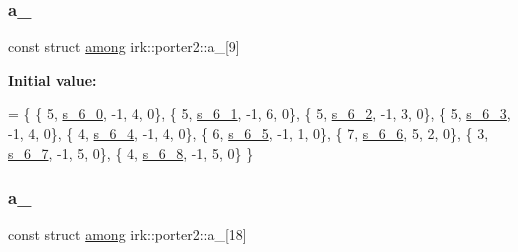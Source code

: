 \mbox{\label{namespaceirk_1_1porter2_a65268a235d37ebbee2bb1feccb9b3073}} 
\subsubsection{\texorpdfstring{a\+\_}{a\_6}}
{\footnotesize\ttfamily const struct \mbox{\hyperlink{structirk_1_1porter2_1_1among}{among}} irk\+::porter2\+::a\+\_\mbox{[}9\mbox{]}\hspace{0.3cm}{\ttfamily [static]}}

{\bfseries Initial value\+:}
\begin{DoxyCode}
=
\{
 \{ 5, \mbox{\hyperlink{namespaceirk_1_1porter2_a72f9928fd5c42ef2b17723ad9645b7ad}{s\_6\_0}}, -1, 4, 0\},
 \{ 5, \mbox{\hyperlink{namespaceirk_1_1porter2_a775975e6472f53e7604d60c98f750372}{s\_6\_1}}, -1, 6, 0\},
 \{ 5, \mbox{\hyperlink{namespaceirk_1_1porter2_a6540eec9911e60f67fcc71d797abea12}{s\_6\_2}}, -1, 3, 0\},
 \{ 5, \mbox{\hyperlink{namespaceirk_1_1porter2_a50329184128fbafc6f9218e641691fd2}{s\_6\_3}}, -1, 4, 0\},
 \{ 4, \mbox{\hyperlink{namespaceirk_1_1porter2_a37a24540ee8bde6457769e7e5da54ee1}{s\_6\_4}}, -1, 4, 0\},
 \{ 6, \mbox{\hyperlink{namespaceirk_1_1porter2_aaa5df8898e37c93a5fc62398b3f7aeb5}{s\_6\_5}}, -1, 1, 0\},
 \{ 7, \mbox{\hyperlink{namespaceirk_1_1porter2_ae1f3ec4f83dbefc11a9b231e1ad15963}{s\_6\_6}}, 5, 2, 0\},
 \{ 3, \mbox{\hyperlink{namespaceirk_1_1porter2_a0dbe9d569ab6b14f4696d4c3a5708b58}{s\_6\_7}}, -1, 5, 0\},
 \{ 4, \mbox{\hyperlink{namespaceirk_1_1porter2_ac96306b86c6642b58fa93f26d2bf4f4f}{s\_6\_8}}, -1, 5, 0\}
\}
\end{DoxyCode}
\mbox{\label{namespaceirk_1_1porter2_a3044b8c5073600b17fdb4a83f7ef92a9}} 
\subsubsection{\texorpdfstring{a\+\_}{a\_7}}
{\footnotesize\ttfamily const struct \mbox{\hyperlink{structirk_1_1porter2_1_1among}{among}} irk\+::porter2\+::a\+\_\mbox{[}18\mbox{]}\hspace{0.3cm}{\ttfamily [static]}}

